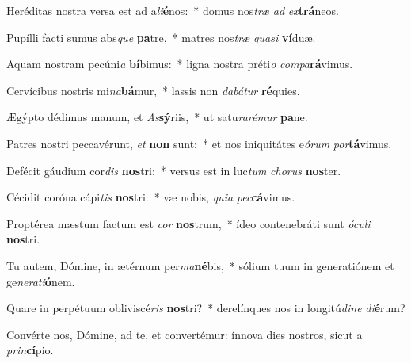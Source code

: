\item Heréditas nostra versa est ad a\textit{li}\textbf{é}nos:~* domus nos\textit{træ} \textit{ad} \textit{ex}\textbf{trá}neos.
\item Pupílli facti sumus abs\textit{que} \textbf{pa}tre,~* matres nos\textit{træ} \textit{qua}\textit{si} \textbf{ví}duæ.
\item Aquam nostram pecúni\textit{a} \textbf{bí}bimus:~* ligna nostra préti\textit{o} \textit{com}\textit{pa}\textbf{rá}vimus.
\item Cervícibus nostris mi\textit{na}\textbf{bá}mur,~* lassis non \textit{da}\textit{bá}\textit{tur} \textbf{ré}quies.
\item Ægýpto dédimus manum, et \textit{As}\textbf{sý}riis,~* ut satu\textit{ra}\textit{ré}\textit{mur} \textbf{pa}ne.
\item Patres nostri peccavérunt, \textit{et} \textbf{non} sunt:~* et nos iniquitátes e\textit{ó}\textit{rum} \textit{por}\textbf{tá}vimus.
\item Defécit gáudium cor\textit{dis} \textbf{nos}tri:~* versus est in luc\textit{tum} \textit{cho}\textit{rus} \textbf{nos}ter.
\item Cécidit coróna cápi\textit{tis} \textbf{nos}tri:~* væ nobis, \textit{qui}\textit{a} \textit{pec}\textbf{cá}vimus.
\item Proptérea mæstum factum est \textit{cor} \textbf{nos}trum,~* ídeo contenebráti sunt \textit{ó}\textit{cu}\textit{li} \textbf{nos}tri.
\item Tu autem, Dómine, in ætérnum per\textit{ma}\textbf{né}bis,~* sólium tuum in generatiónem et ge\textit{ne}\textit{ra}\textit{ti}\textbf{ó}nem.
\item Quare in perpétuum obliviscé\textit{ris} \textbf{nos}tri?~* derelínques nos in longitú\textit{di}\textit{ne} \textit{di}\textbf{é}rum?
\item Convérte nos, Dómine, ad te, et convertémur: ínnova dies nostros, sicut a \textit{prin}\textbf{cí}pio.
